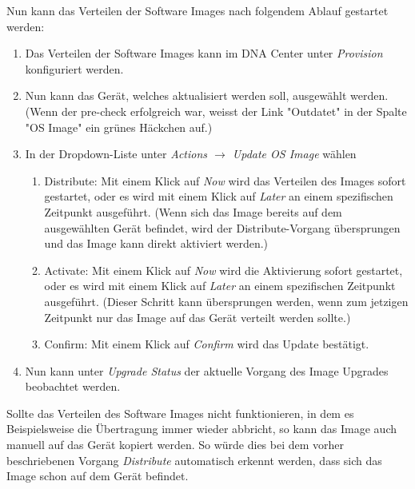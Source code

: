 Nun kann das Verteilen der Software Images nach folgendem Ablauf gestartet werden:
\begin{enumerate}
	\item Das Verteilen der Software Images kann im DNA Center unter \textit{Provision} konfiguriert werden.
	\item Nun kann das Gerät, welches aktualisiert werden soll, ausgewählt werden. (Wenn der pre-check erfolgreich war, weisst der Link "Outdatet" in der Spalte "OS Image" ein grünes Häckchen auf.)
	\item In der Dropdown-Liste unter \textit{Actions  $\rightarrow$ Update OS Image} wählen
	\begin{enumerate}
		\item Distribute: Mit einem Klick auf \textit{Now} wird das Verteilen des Images sofort gestartet, oder es wird mit einem Klick auf \textit{Later} an einem spezifischen Zeitpunkt ausgeführt. (Wenn sich das Image bereits auf dem ausgewählten Gerät befindet, wird der Distribute-Vorgang übersprungen und das Image kann direkt aktiviert werden.)
		\item Activate: Mit einem Klick auf \textit{Now} wird die Aktivierung sofort gestartet, oder es wird mit einem Klick auf \textit{Later} an einem spezifischen Zeitpunkt ausgeführt. (Dieser Schritt kann übersprungen werden, wenn zum jetzigen Zeitpunkt nur das Image auf das Gerät verteilt werden sollte.)
		\item Confirm: Mit einem Klick auf \textit{Confirm} wird das Update bestätigt.
	\end{enumerate}
	\item Nun kann unter \textit{Upgrade Status} der aktuelle Vorgang des Image Upgrades beobachtet werden.
\end{enumerate}

Sollte das Verteilen des Software Images nicht funktionieren, in dem es Beispielsweise die Übertragung immer wieder abbricht, so kann das Image auch manuell auf das Gerät kopiert werden. So würde dies bei dem vorher beschriebenen Vorgang \textit{Distribute} automatisch erkennt werden, dass sich das Image schon auf dem Gerät befindet.


